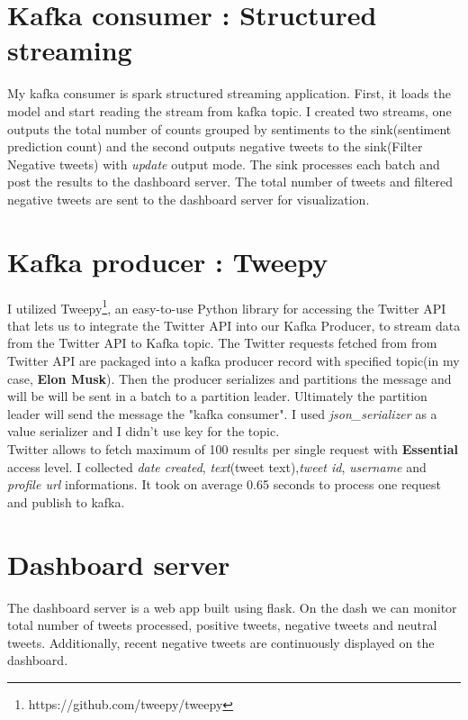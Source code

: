 \documentclass[12pt,a4paper]{report}
\begin{document}
\section{Kafka consumer : Structured streaming}
My kafka consumer is spark structured streaming application. First, it loads the model and start reading the stream from kafka topic. I created two streams, one outputs the total number of counts grouped by sentiments to the sink(sentiment prediction count) and the second outputs negative tweets to the sink(Filter Negative tweets) with \textit{update} output mode. The sink processes each batch and post the results to the dashboard server. The total number of tweets and filtered negative tweets are sent to the dashboard server for visualization. 

\section{Kafka producer : Tweepy}

I utilized Tweepy\footnote{https://github.com/tweepy/tweepy}, an easy-to-use Python library for accessing the Twitter API that lets us to integrate the Twitter API into our Kafka Producer, to stream data from the Twitter API to Kafka topic. The Twitter requests fetched from from Twitter API are packaged into a kafka producer record with specified topic(in my case, \textbf{Elon Musk}). Then the producer serializes and partitions the message and will be will be sent in a batch to a partition leader. Ultimately the partition leader will send the message the "kafka consumer". I used \textit{json\_serializer} as a value serializer and I didn't use key for the topic.\\

 Twitter allows to fetch maximum of 100 results per single request with \textbf{Essential} access level. I collected \textit{date created}, \textit{text}(tweet text),\textit{tweet id}, \textit{username} and \textit{profile url} informations. It took on average 0.65 seconds to process one request and publish to kafka.
 
\section{Dashboard server}
The dashboard server is a web app built using flask. On the dash we can monitor total number of tweets processed, positive tweets, negative tweets and neutral tweets. Additionally, recent negative tweets are continuously displayed on the dashboard.
\end{document}
